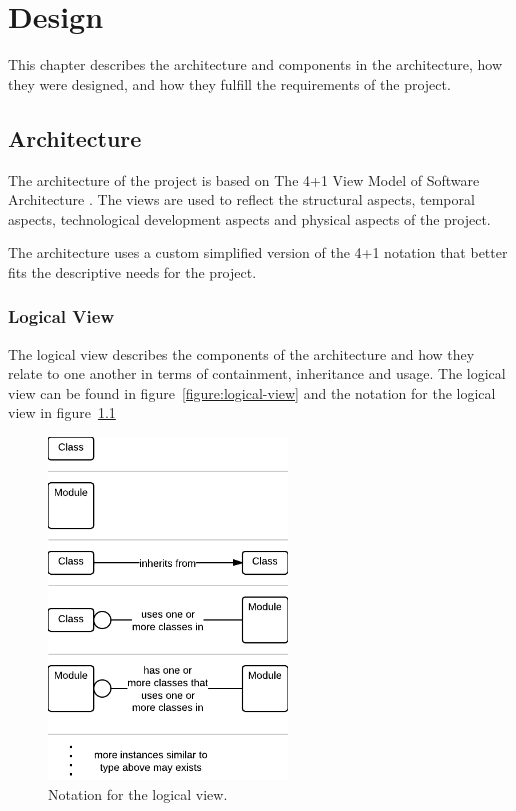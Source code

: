 
\chapter{Design}

\minitoc
This chapter describes the architecture and components in the architecture, how they were designed, and how they fulfill the requirements of the project.

\clearpage

\section{Architecture}
The architecture of the project is based on The 4+1 View Model of Software Architecture \cite{Kruchten}. The views are used to reflect the structural aspects, temporal aspects, technological development aspects and physical aspects of the project.

The architecture uses a custom simplified version of the 4+1 notation that better fits the descriptive needs for the project.


\subsection{Logical View}
The logical view describes the components of the architecture and how they relate to one another in terms of containment, inheritance and usage. The logical view can be found in figure~\ref{figure:logical-view} and the notation for the logical view in figure~\ref{figure:logical-view-notation}

\begin{figure}[H]
\centerline{\includegraphics[width=2.5in]{image/architecture-logical-view-notation.png}}
\caption[Notation for the logical view]{Notation for the logical view.}
\label{figure:logical-view-notation}
\end{figure}

